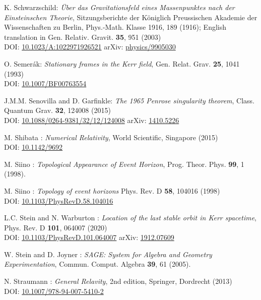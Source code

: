\begin{thebibliography}{123}
K. Schwarzschild:
{\em \"Uber das Gravitationsfeld eines Massenpunktes nach der Einsteinschen Theorie},
Sitzungsberichte der K\"oniglich Preussischen Akademie der Wissenschaften zu Berlin, Phys.-Math. Klasse 1916, 189 (1916);
English translation in Gen. Relativ. Gravit. {\bf 35}, 951 (2003)\\
DOI: \href{https://doi.org/10.1023/A:1022971926521}{10.1023/A:1022971926521}\hfill
arXiv: \href{https://arxiv.org/abs/physics/9905030}{physics/9905030}

O. Semer\'ak:
{\em Stationary frames in the Kerr field},
Gen. Relat. Grav. {\bf 25}, 1041 (1993)\\
DOI: \href{https://doi.org/10.1007/BF00763554}{10.1007/BF00763554}

J.M.M. Senovilla and D. Garfinkle:
{\em The 1965 Penrose singularity theorem},
Class. Quantum Grav. {\bf 32}, 124008 (2015)\\
DOI: \href{https://doi.org/10.1088/0264-9381/32/12/124008}{10.1088/0264-9381/32/12/124008}\hfill
arXiv: \href{https://arxiv.org/abs/1410.5226}{1410.5226}

M. Shibata :
{\em Numerical Relativity},
World Scientific, Singapore (2015)\\
DOI: \href{https://doi.org/10.1142/9692}{10.1142/9692}

M. Siino : {\em Topological Appearance of Event Horizon},
Prog. Theor. Phys. {\bf 99}, 1 (1998).

M. Siino : {\em Topology of event horizons}
Phys. Rev. D {\bf 58}, 104016 (1998)\\
DOI: \href{https://doi.org/10.1103/PhysRevD.58.104016}{10.1103/PhysRevD.58.104016}

L.C. Stein and N. Warburton :
{\em Location of the last stable orbit in Kerr spacetime},
Phys. Rev. D  {\bf 101}, 064007 (2020)\\
DOI: \href{https://doi.org/10.1103/PhysRevD.101.064007}{10.1103/PhysRevD.101.064007}\hfill
arXiv: \href{https://arxiv.org/abs/1912.07609}{1912.07609}

W. Stein and D. Joyner : {\em SAGE: System for Algebra and Geometry Experimentation},
Commun. Comput. Algebra {\bf 39}, 61 (2005).

N. Straumann : \emph{General Relavity}, 2nd edition,
Springer, Dordrecht (2013)\\
DOI: \href{https://doi.org/10.1007/978-94-007-5410-2}{10.1007/978-94-007-5410-2}


\end{thebibliography}
